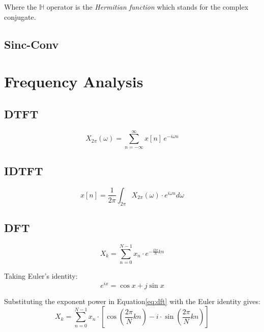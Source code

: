 Where the \(\mathbb{H}\) operator
is the \emph{Hermitian function} which stands for
the complex conjugate.

\subsection{Sinc-Conv}




\section{Frequency Analysis}
\subsection{DTFT}
\begin{equation}
    X_{2\pi}(\omega) = \sum_{n=-\infty}^{\infty} x[n] \,e^{-i \omega n}
\end{equation}


\subsection{IDTFT}
\begin{equation}
    x[n] = \frac{1}{2 \pi}\int_{2\pi} X_{2\pi}(\omega)\cdot e^{i \omega n} d\omega
\end{equation}

\subsection{DFT}
\begin{equation}
    \label{eq:dft}
    X_k = \sum_{n=0}^{N-1} x_n \cdot e^{-\frac {i 2\pi}{N}kn}
\end{equation}

Taking Euler's identity:
\begin{equation}
    e^{ix} = \cos x + j\sin x
\end{equation}

Substituting the exponent power in Equation\;\ref{eq:dft} with the Euler identity
gives:
\begin{equation}
    X_k = \sum_{n=0}^{N-1} x_n \cdot \left[\cos\left(\frac{2 \pi}{N}kn\right)
        - i \cdot \sin\left(\frac{2 \pi}{N}kn\right)\right]
\end{equation}


